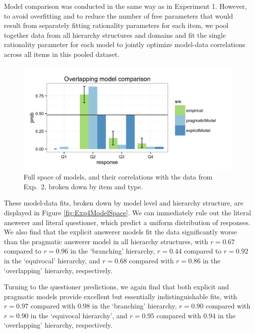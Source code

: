 \documentclass[12pt, floatsintext, jou]{apa6}
\begin{document}
Model comparison was conducted in the same way as in Experiment 1. However, to avoid overfitting and to reduce the number of free parameters that would result from separately fitting rationality parameters for each item, we pool together data from all hierarchy structures and domains and fit the single rationality parameter for each model to jointly optimize model-data correlations across all items in this pooled dataset. 
%
\begin{figure}[t!]
\begin{center}
\includegraphics[scale=.25]{OverlappingModelComparison.png}
\end{center}
\vspace{-.5cm}
\caption{Full space of models, and their correlations with the data from Exp.~2, broken down by item and type.}
\label{fig:Exp4ZoomedIn}
\vspace{-.15cm}
\end{figure}
%
These model-data fits, broken down by model level and hierarchy structure, are displayed in Figure \ref{fig:Exp4ModelSpace}. We can immediately rule out the literal answerer and literal questioner, which predict a uniform distribution of responses. We also find that the explicit answerer models fit the data significantly worse than the pragmatic answerer model in all hierarchy structures, with $r = 0.67$ compared to $r = 0.96$ in the `branching' hierarchy, $r = 0.44$ compared to $r = 0.92$ in the `equivocal' hierarchy, and $r = 0.68$ compared with $r = 0.86$ in the `overlapping' hierarchy, respectively. 

Turning to the questioner predictions, we again find that both explicit and pragmatic models provide excellent but essentially indistinguishable fits, with $r = 0.97$ compared with $0.98$ in the `branching' hierarchy, $r = 0.90$ compared with $r = 0.90$ in the `equivocal hierarchy', and $r = 0.95$ compared with $0.94$ in the `overlapping' hierarchy, respectively. 
\end{document}

